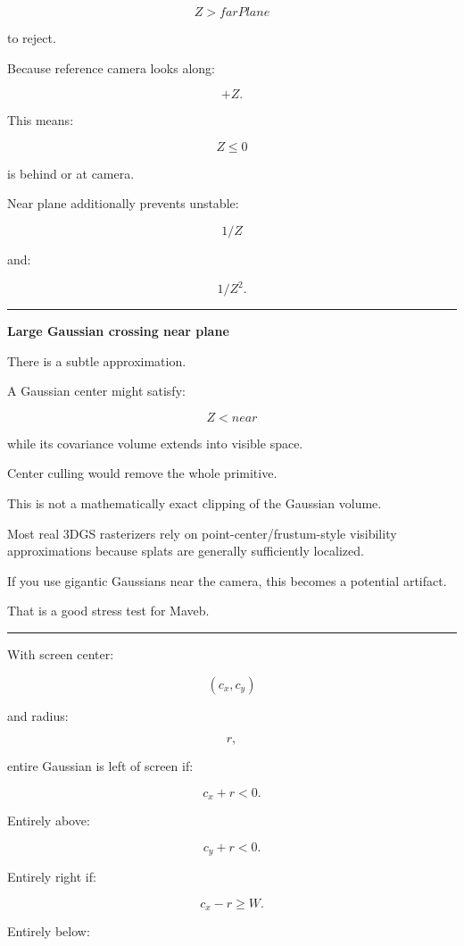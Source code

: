 \[
Z>farPlane
\]

to reject.

Because reference camera looks along:

\[
+Z.
\]

This means:

\[
Z\le0
\]

is behind or at camera.

Near plane additionally prevents unstable:

\[
1/Z
\]

and:

\[
1/Z^2.
\]

\begin{center}\rule{0.5\linewidth}{0.5pt}\end{center}

\textbf{Large Gaussian crossing near plane}

There is a subtle approximation.

A Gaussian center might satisfy:

\[
Z<near
\]

while its covariance volume extends into visible space.

Center culling would remove the whole primitive.

This is not a mathematically exact clipping of the Gaussian volume.

Most real 3DGS rasterizers rely on point-center/frustum-style visibility approximations because splats are generally sufficiently localized.

If you use gigantic Gaussians near the camera, this becomes a potential artifact.

That is a good stress test for Maveb.

\begin{center}\rule{0.5\linewidth}{0.5pt}\end{center}

With screen center:

\[
(c_x,c_y)
\]

and radius:

\[
r,
\]

entire Gaussian is left of screen if:

\[
c_x+r<0.
\]

Entirely above:

\[
c_y+r<0.
\]

Entirely right if:

\[
c_x-r\ge W.
\]

Entirely below:

